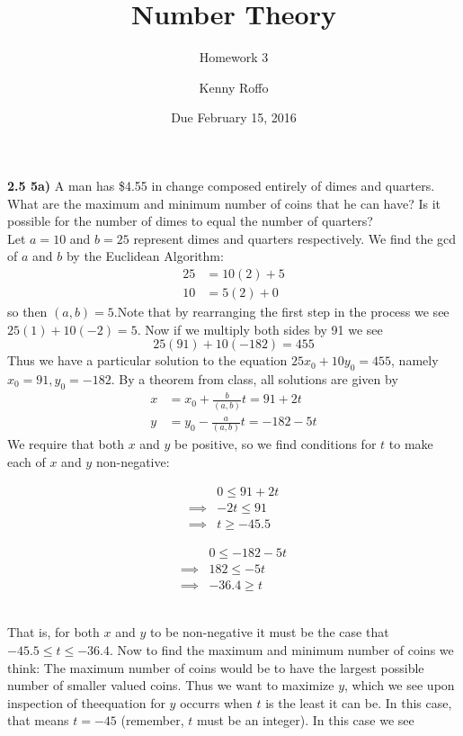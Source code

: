 \documentclass{scrartcl}
\title{Number Theory}
\subtitle{Homework 3}
\author{Kenny Roffo}
\date{Due February 15, 2016}
\begin{document}
\maketitle

\textbf{2.5 5a)} A man has \$4.55 in change composed entirely of dimes and quarters. What are the maximum and minimum number of coins that he can have? Is it possible for the number of dimes to equal the number of quarters?\\

Let $a = 10$ and $b = 25$ represent dimes and quarters respectively. We find the gcd of $a$ and $b$ by the Euclidean Algorithm:
\begin{align*}
  25 &= 10(2) + 5\\
  10 &= 5(2) + 0
\end{align*}
so then $(a,b) = 5$.Note that by rearranging the first step in the process we see $25(1) + 10(-2) = 5$. Now if we multiply both sides by 91 we see $$25(91) + 10(-182) = 455$$ Thus we have a particular solution to the equation $25x_0+10y_0 = 455$, namely $x_0=91, y_0=-182$. By a theorem from class, all solutions are given by
\begin{align*}
  x &= x_0 + \frac{b}{(a,b)}t = 91 + 2t\\
  y &= y_0 - \frac{a}{(a,b)}t = -182 - 5t
\end{align*}
We require that both $x$ and $y$ be positive, so we find conditions for $t$ to make each of $x$ and $y$ non-negative:\\
\begin{minipage}{0.45\linewidth}
  \begin{align*}
    &0 \le 91 + 2t\\
    \implies&-2t \le 91\\
    \implies&t \ge -45.5
  \end{align*}
\end{minipage}
\begin{minipage}{0.45\linewidth}
  \begin{align*}
    &0 \le -182 - 5t\\
    \implies&182 \le -5t\\
    \implies&-36.4 \ge t
  \end{align*}
\end{minipage}
\ \\
That is, for both $x$ and $y$ to be non-negative it must be the case that $-45.5 \le t \le -36.4$. Now to find the maximum and minimum number of coins we think: The maximum number of coins would be to have the largest possible number of smaller valued coins. Thus we want to maximize $y$, which we see upon inspection of theequation for $y$ occurrs when $t$ is the least it can be. In this case, that means $t = -45$ (remember, $t$ must be an integer). In this case we see\\
\end{document}
